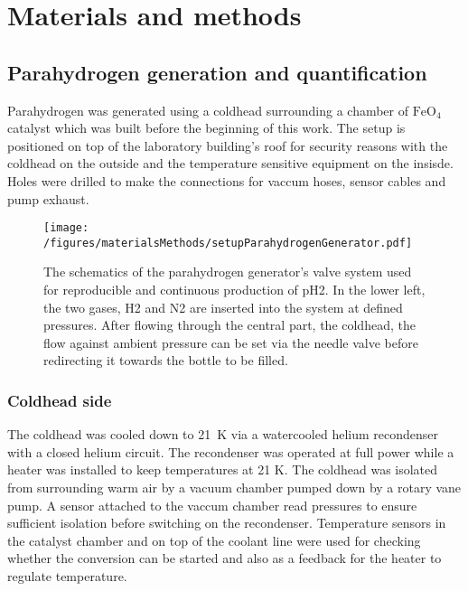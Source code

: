 \chapter{Materials and methods}\label{chap:MaterialsAndMethods}
    \section{Parahydrogen generation and quantification}
    Parahydrogen was generated using a coldhead surrounding a chamber of $\mathrm{FeO_4}$ catalyst which was built before the beginning of this work. The setup is positioned on top of the laboratory building's roof for security reasons with the coldhead on the outside and the temperature sensitive equipment on the insisde. Holes were drilled to make the connections for vaccum hoses, sensor cables and pump exhaust.
    \begin{figure}
        \texttt{[image: /figures/materialsMethods/setupParahydrogenGenerator.pdf]}
        \caption[Parahydrogen generator scheme]{The schematics of the parahydrogen generator's valve system used for reproducible and continuous production of pH2. In the lower left, the two gases, H2 and N2 are inserted into the system at defined pressures. After flowing through the central part, the coldhead, the flow against ambient pressure can be set via the needle valve before redirecting it towards the bottle to be filled.}
        \label{figure:materialsMethods:pH2Generator}
    \end{figure}
        \subsection{Coldhead side}
            The coldhead was cooled down to \SI{21}{\kelvin} via a watercooled helium recondenser with a closed helium circuit. The recondenser was operated at full power while a heater was installed to keep temperatures at 21 K. The coldhead was isolated from surrounding warm air by a vacuum chamber pumped down by a rotary vane pump. A sensor attached to the vaccum chamber read pressures to ensure sufficient isolation before switching on the recondenser. Temperature sensors in the catalyst chamber and on top of the coolant line were used for checking whether the conversion can be started and also as a feedback for the heater to regulate temperature.

